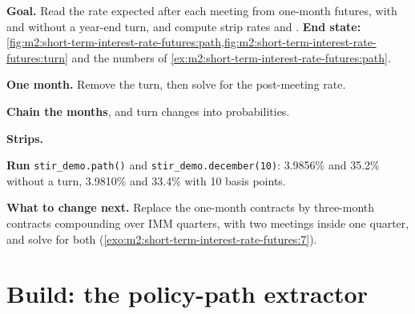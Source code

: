 \begin{tutorial}
\textbf{Goal.} Read the rate expected after each meeting from one-month futures,
with and without a year-end turn, and compute strip rates and . \textbf{End state:}
\cref{fig:m2:short-term-interest-rate-futures:path,fig:m2:short-term-interest-rate-futures:turn}
and the numbers of \cref{ex:m2:short-term-interest-rate-futures:path}.
\begin{tutsteps}
\item \textbf{One month.} Remove the turn, then solve for the post-meeting rate.
\label{lst:m2:short-term-interest-rate-futures:after}
\item \textbf{Chain the months}, and turn changes into probabilities.
\label{lst:m2:short-term-interest-rate-futures:path}
\item \textbf{Strips.}
\label{lst:m2:short-term-interest-rate-futures:strip}
\item \textbf{Run} \texttt{stir\_demo.path()} and \texttt{stir\_demo.december(10)}:
3.9856\% and 35.2\% without a turn, 3.9810\% and 33.4\% with 10 basis points.
\end{tutsteps}
\textbf{What to change next.} Replace the one-month contracts by three-month
contracts compounding over IMM quarters, with two meetings inside one quarter,
and solve for both (\cref{exo:m2:short-term-interest-rate-futures:7}).
\end{tutorial}

\section{Build: the policy-path extractor}\label{bld:m2:short-term-interest-rate-futures:meetings}

